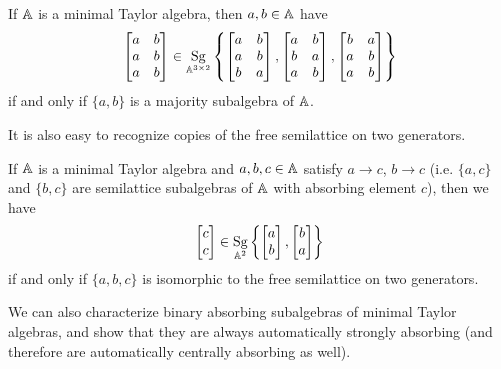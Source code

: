 \documentclass[letterpaper,11pt]{article}
\DeclareMathOperator{\Sg}{Sg}
\begin{document}
\begin{prop} If $\mathbb{A}$ is a minimal Taylor algebra, then $a, b \in \mathbb{A}$ have
\[
\begin{bmatrix} a & b\\ a & b\\ a & b\end{bmatrix} \in \Sg_{\bA^{3\times 2}}\left\{\begin{bmatrix} a & b\\ a & b\\ b & a\end{bmatrix}, \begin{bmatrix} a & b\\ b & a\\ a & b\end{bmatrix}, \begin{bmatrix} b & a\\ a & b\\ a & b\end{bmatrix}\right\}
\]
if and only if $\{a,b\}$ is a majority subalgebra of $\mathbb{A}$.
\end{prop}

It is also easy to recognize copies of the free semilattice on two generators.

\begin{prop} If $\mathbb{A}$ is a minimal Taylor algebra and $a,b,c \in \mathbb{A}$ satisfy $a \rightarrow c$, $b \rightarrow c$ (i.e. $\{a,c\}$ and $\{b,c\}$ are semilattice subalgebras of $\mathbb{A}$ with absorbing element $c$), then we have
\[
\begin{bmatrix} c\\ c\end{bmatrix} \in \Sg_{\bA^2}\left\{\begin{bmatrix} a\\ b\end{bmatrix}, \begin{bmatrix} b\\ a\end{bmatrix}\right\}
\]
if and only if $\{a,b,c\}$ is isomorphic to the free semilattice on two generators.
\end{prop}

We can also characterize binary absorbing subalgebras of minimal Taylor algebras, and show that they are always automatically strongly absorbing (and therefore are automatically centrally absorbing as well).
\end{document}
